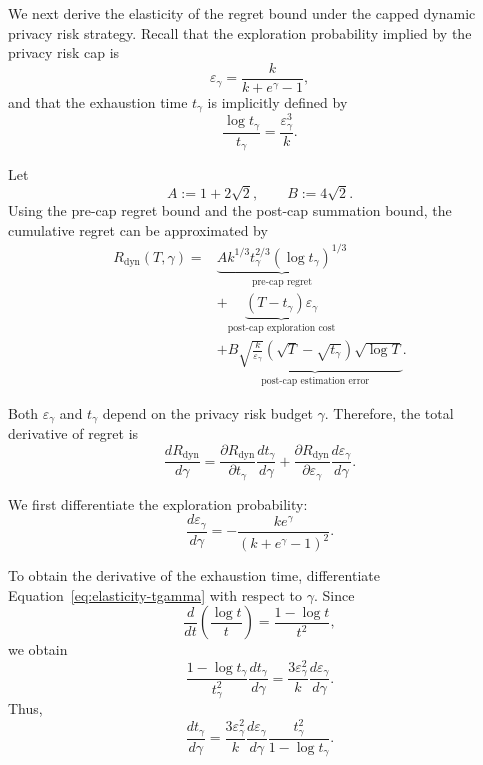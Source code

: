 \documentclass[mksc,nonblindrev]{informs3}
\begin{document}
\begin{APPENDICES}
We next derive the elasticity of the regret bound under the capped dynamic privacy risk strategy. Recall that the exploration probability implied by the privacy risk cap is
\[
\varepsilon_\gamma
=
\frac{k}{k+e^\gamma-1},
\]
and that the exhaustion time \(t_\gamma\) is implicitly defined by
\begin{equation}
\label{eq:elasticity-tgamma}
\frac{\log t_\gamma}{t_\gamma}
=
\frac{\varepsilon_\gamma^3}{k}.
\end{equation}

Let
\[
A:=1+2\sqrt{2},
\qquad
B:=4\sqrt{2}.
\]
Using the pre-cap regret bound and the post-cap summation bound, the cumulative regret can be approximated by
\begin{equation}
\label{eq:dynamic-regret-elasticity}
\begin{aligned}
R_{\mathrm{dyn}}(T,\gamma)
={}&
\underbrace{
A k^{1/3}t_\gamma^{2/3}
(\log t_\gamma)^{1/3}
}_{\text{pre-cap regret}}
\\
&+
\underbrace{
(T-t_\gamma)\varepsilon_\gamma
}_{\text{post-cap exploration cost}}
\\
&+
\underbrace{
B\sqrt{\frac{k}{\varepsilon_\gamma}}
\left(\sqrt{T}-\sqrt{t_\gamma}\right)
\sqrt{\log T}
}_{\text{post-cap estimation error}}.
\end{aligned}
\end{equation}

Both \(\varepsilon_\gamma\) and \(t_\gamma\) depend on the privacy risk budget \(\gamma\). Therefore, the total derivative of regret is
\begin{equation}
\label{eq:dynamic-total-derivative}
\frac{dR_{\mathrm{dyn}}}{d\gamma}
=
\frac{\partial R_{\mathrm{dyn}}}{\partial t_\gamma}
\frac{dt_\gamma}{d\gamma}
+
\frac{\partial R_{\mathrm{dyn}}}{\partial\varepsilon_\gamma}
\frac{d\varepsilon_\gamma}{d\gamma}.
\end{equation}

We first differentiate the exploration probability:
\begin{equation}
\label{eq:dynamic-deps-dgamma}
\frac{d\varepsilon_\gamma}{d\gamma}
=
-\frac{k e^\gamma}
{\left(k+e^\gamma-1\right)^2}.
\end{equation}

To obtain the derivative of the exhaustion time, differentiate Equation~\eqref{eq:elasticity-tgamma} with respect to \(\gamma\). Since
\[
\frac{d}{dt}
\left(\frac{\log t}{t}\right)
=
\frac{1-\log t}{t^2},
\]
we obtain
\[
\frac{1-\log t_\gamma}{t_\gamma^2}
\frac{dt_\gamma}{d\gamma}
=
\frac{3\varepsilon_\gamma^2}{k}
\frac{d\varepsilon_\gamma}{d\gamma}.
\]
Thus,
\begin{equation}
\label{eq:dynamic-dtgamma-dgamma}
\frac{dt_\gamma}{d\gamma}
=
\frac{3\varepsilon_\gamma^2}{k}
\frac{d\varepsilon_\gamma}{d\gamma}
\frac{t_\gamma^2}{1-\log t_\gamma}.
\end{equation}


\end{APPENDICES}
\end{document}
